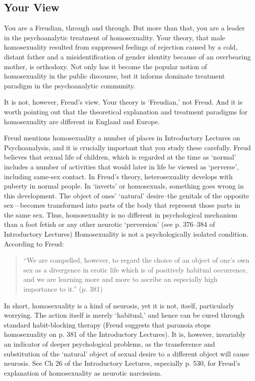 \begin{refsection}
\section{Your View}
\label{yourview}

You are a Freudian, through and through. But more than that, you are a leader in the psychoanalytic treatment of homosexuality. Your theory, that male homosexuality resulted from suppressed feelings of rejection caused by a cold, distant father and a misidentification of gender identity because of an overbearing mother, is orthodoxy. Not only has it become the popular notion of homosexuality in the public discourse, but it informs dominate treatment paradigm in the psychoanalytic community.

It is not, however, Freud's view. Your theory is `Freudian,' not Freud. And it is worth pointing out that the theoretical explanation and treatment paradigms for homosexuality are different in England and Europe.

Freud mentions homosexuality a number of places in Introductory Lectures on Psychoanalysis, and it is crucially important that you study these carefully. Freud believes that sexual life of children, which is regarded at the time as `normal' includes a number of activities that would later in life be viewed as `perverse', including same-sex contact. In Freud's theory, heterosexuality develops with puberty in normal people. In `inverts' or homosexuals, something goes wrong in this development. The object of ones' `natural' desire--the genitals of the opposite sex---becomes transformed into parts of the body that represent those parts in the same sex. Thus, homosexuality is no different in psychological mechanism than a foot fetish or any other neurotic `perversion' (see p. 376--384 of Introductory Lectures) Homosexuality is not a psychologically isolated condition. According to Freud:

\begin{quote}

``We are compelled, however, to regard the choice of an object of one's own sex as a divergence in erotic life which is of positively habitual occurrence, and we are learning more and more to ascribe an especially high importance to it.'' (p. 381)
\end{quote}

In short, homosexuality is a kind of neurosis, yet it is not, itself, particularly worrying. The action itself is merely `habitual,' and hence can be cured through standard habit-blocking therapy (Freud suggests that paranoia stops homosexuality on p. 381 of the Introductory Lectures). It is, however, invariably an indicator of deeper psychological problems, as the transference and substitution of the `natural' object of sexual desire to a different object will cause neurosis. See Ch 26 of the Introductory Lectures, especially p. 530, for Freud's explanation of homosexuality as neurotic narcissism.


\end{refsection}
